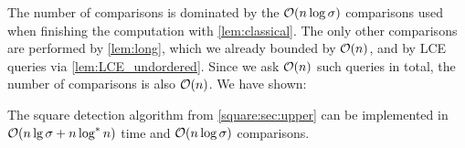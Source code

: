 The number of comparisons is dominated by the $\mathcal{O}(n \log \sigma)$ comparisons used when finishing the computation with \cref{lem:classical}. The only other comparisons are performed by \cref{lem:long}, which we already bounded by $\mathcal{O}(n)$, and by LCE queries via \cref{lem:LCE_undordered}. Since we ask $\mathcal{O}(n)$ such queries in total, the number of comparisons is also $\mathcal{O}(n)$.
We have shown:

\begin{lemma}
The square detection algorithm from \cref{square:sec:upper} can be implemented in $\mathcal{O}(n \lg \sigma + n \log^* n)$ time and $\mathcal{O}(n \log \sigma)$ comparisons.
\end{lemma}
